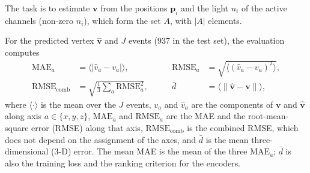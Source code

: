 The task is to estimate $\mathbf{v}$ from the positions $\mathbf{p}_i$ and the light $n_i$ of the active channels (non-zero $n_i$), which form the set $A$, with $|A|$ elements.

For the predicted vertex $\hat{\mathbf{v}}$ and $J$ events (\num{937} in the test set), the evaluation computes
\begin{equation}
  \begin{aligned}
    \mathrm{MAE}_a &= \bigl\langle \lvert \hat{v}_a - v_a \rvert \bigr\rangle, &\qquad
    \mathrm{RMSE}_a &= \sqrt{\bigl\langle (\hat{v}_a - v_a)^2 \bigr\rangle}, \\
    \mathrm{RMSE}_{\mathrm{comb}} &= \sqrt{\tfrac{1}{3} \textstyle\sum_{a} \mathrm{RMSE}_a^2}, &\qquad
    \bar{d} &= \bigl\langle \lVert \hat{\mathbf{v}} - \mathbf{v} \rVert \bigr\rangle,
  \end{aligned}
  \label{eq:metricas}
\end{equation}
where $\langle\cdot\rangle$ is the mean over the $J$ events, $v_a$ and $\hat{v}_a$ are the components of $\mathbf{v}$ and $\hat{\mathbf{v}}$ along axis $a \in \{x, y, z\}$, $\mathrm{MAE}_a$ and $\mathrm{RMSE}_a$ are the MAE and the root-mean-square error (RMSE) along that axis, $\mathrm{RMSE}_{\mathrm{comb}}$ is the combined RMSE, which does not depend on the assignment of the axes, and $\bar{d}$ is the mean three-dimensional (3-D) error. The mean MAE is the mean of the three $\mathrm{MAE}_a$; $\bar{d}$ is also the training loss and the ranking criterion for the encoders.
